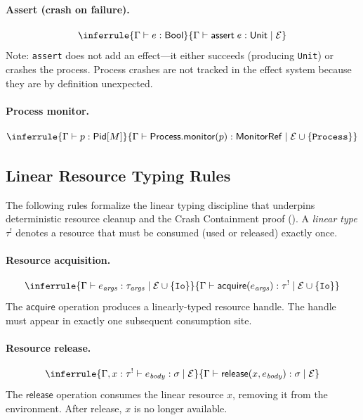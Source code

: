 \documentclass[11pt,twocolumn]{article}
\newcommand{\Eff}{\mathcal{E}}
\begin{document}
\paragraph{Assert (crash on failure).}
\[
  \inferrule
    {\Gamma \vdash e : \mathsf{Bool}}
    {\Gamma \vdash \mathsf{assert}\; e : \mathsf{Unit} \mid \Eff}
\]
Note: \texttt{assert} does not add an effect---it either succeeds (producing \texttt{Unit}) or crashes the process. Process crashes are not tracked in the effect system because they are by definition unexpected.

\paragraph{Process monitor.}
\[
  \inferrule
    {\Gamma \vdash p : \mathsf{Pid}[M]}
    {\Gamma \vdash \mathsf{Process.monitor}(p) : \mathsf{MonitorRef} \mid \Eff \cup \{\texttt{Process}\}}
\]

\subsection{Linear Resource Typing Rules}

The following rules formalize the linear typing discipline that underpins deterministic resource cleanup and the Crash Containment proof (). A \emph{linear type} $\tau^{!}$ denotes a resource that must be consumed (used or released) exactly once.

\paragraph{Resource acquisition.}
\[
  \inferrule
    {\Gamma \vdash e_{\mathit{args}} : \tau_{\mathit{args}} \mid \Eff \cup \{\texttt{Io}\}}
    {\Gamma \vdash \mathsf{acquire}(e_{\mathit{args}}) : \tau^{!} \mid \Eff \cup \{\texttt{Io}\}}
\]
The $\mathsf{acquire}$ operation produces a linearly-typed resource handle. The handle must appear in exactly one subsequent consumption site.

\paragraph{Resource release.}
\[
  \inferrule
    {\Gamma, x : \tau^{!} \vdash e_{\mathit{body}} : \sigma \mid \Eff}
    {\Gamma \vdash \mathsf{release}(x, e_{\mathit{body}}) : \sigma \mid \Eff}
\]
The $\mathsf{release}$ operation consumes the linear resource $x$, removing it from the environment. After release, $x$ is no longer available.
\end{document}

